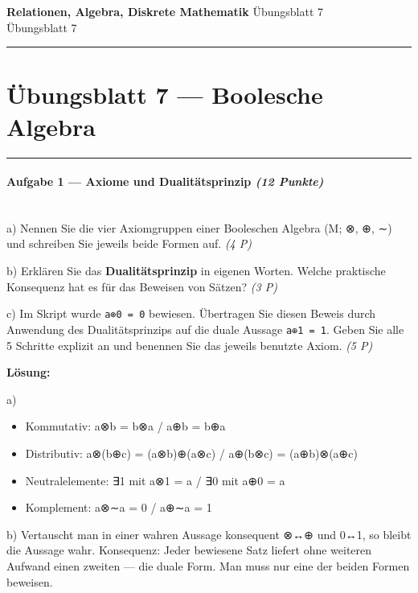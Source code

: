 \documentclass[11pt, a4paper]{article}
\providecommand{\nichttitle}{Übungsblatt}
\providecommand{\nichtsubtitle}{}
\renewcommand{\nichttitle}{Relationen, Algebra, Diskrete Mathematik}
\renewcommand{\nichtsubtitle}{Übungsblatt 7}
\begin{document}
\begin{center}
{\Large\bfseries\color{accent}\nichttitle}
\ifx\nichtsubtitle\empty\else
  \\[2pt]{\normalsize\color{accent!80!black}\nichtsubtitle}
\fi
\\[2pt]
\color{accent}\rule{0.4\linewidth}{0.8pt}\color{black}
\end{center}
\vspace{4pt}


\section{Übungsblatt 7 — Boolesche Algebra}


\noindent\textcolor{rulegray}{\rule{\linewidth}{0.4pt}}


\paragraph{Aufgabe 1 — Axiome und Dualitätsprinzip \textit{(12 Punkte)}}\mbox{}\\[2pt]

a) Nennen Sie die vier Axiomgruppen einer Booleschen Algebra (M; ⊗, ⊕, ∼) und schreiben Sie jeweils beide Formen auf. \textit{(4 P)}


b) Erklären Sie das \textbf{Dualitätsprinzip} in eigenen Worten. Welche praktische Konsequenz hat es für das Beweisen von Sätzen? \textit{(3 P)}


c) Im Skript wurde \texttt{a⊗0 = 0} bewiesen. Übertragen Sie diesen Beweis durch Anwendung des Dualitätsprinzips auf die duale Aussage \texttt{a⊕1 = 1}. Geben Sie alle 5 Schritte explizit an und benennen Sie das jeweils benutzte Axiom. \textit{(5 P)}


\textbf{Lösung:}


a)

\begin{itemize}
  \item Kommutativ: a⊗b = b⊗a / a⊕b = b⊕a
  \item Distributiv: a⊗(b⊕c) = (a⊗b)⊕(a⊗c) / a⊕(b⊗c) = (a⊕b)⊗(a⊕c)
  \item Neutralelemente: ∃1 mit a⊗1 = a / ∃0 mit a⊕0 = a
  \item Komplement: a⊗∼a = 0 / a⊕∼a = 1
\end{itemize}

b) Vertauscht man in einer wahren Aussage konsequent ⊗↔⊕ und 0↔1, so bleibt die Aussage wahr. Konsequenz: Jeder bewiesene Satz liefert ohne weiteren Aufwand einen zweiten — die duale Form. Man muss nur eine der beiden Formen beweisen.
\end{document}
